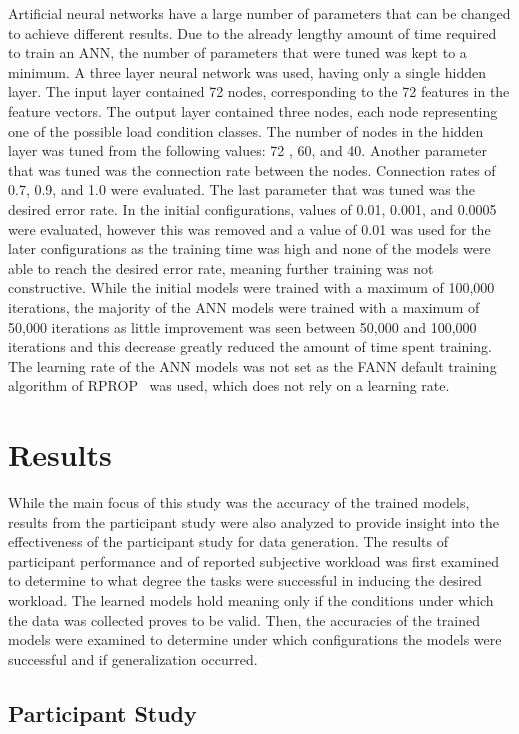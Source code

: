 \documentclass[11pt]{article}
\begin{document}
		Artificial neural networks have a large number of parameters that can be changed to achieve different results. Due to the already lengthy amount of time required to train an ANN, the number of parameters that were tuned was kept to a minimum. A three layer neural network was used, having only a single hidden layer. The input layer contained 72 nodes, corresponding to the 72 features in the feature vectors. The output layer contained three nodes, each node representing one of the possible load condition classes. The number of nodes in the hidden layer was tuned from the following values: 72 , 60, and 40. Another parameter that was tuned was the connection rate between the nodes. Connection rates of 0.7, 0.9, and 1.0 were evaluated. The last parameter that was tuned was the desired error rate. In the initial configurations, values of 0.01, 0.001, and 0.0005 were evaluated, however this was removed and a value of 0.01 was used for the later configurations as the training time was high and none of the models were able to reach the desired error rate, meaning further training was not constructive. While the initial models were trained with a maximum of 100,000 iterations, the majority of the ANN models were trained with a maximum of 50,000 iterations as little improvement was seen between 50,000 and 100,000 iterations and this decrease greatly reduced the amount of time spent training. The learning rate of the ANN models was not set as the FANN default training algorithm of RPROP~\cite{Riedmiller} was used, which does not rely on a learning rate.

\section{Results}
While the main focus of this study was the accuracy of the trained models, results from the participant study were also analyzed to provide insight into the effectiveness of the participant study for data generation. The results of participant performance and of reported subjective workload was first examined to determine to what degree the tasks were successful in inducing the desired workload. The learned models hold meaning only if the conditions under which the data was collected proves to be valid. Then, the accuracies of the trained models were examined to determine under which configurations the models were successful and if generalization occurred. 

	\subsection{Participant Study}
		
\end{document}
